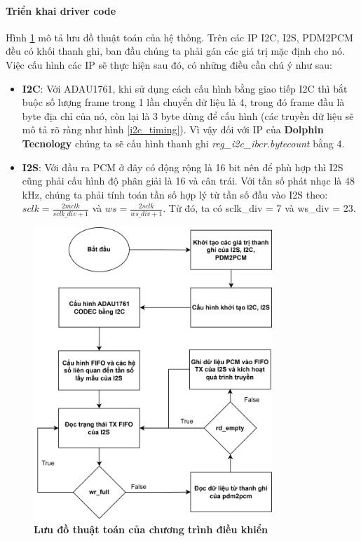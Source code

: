 \paragraph{Triển khai driver code} \label{code}
Hình \ref{flow_chart} mô tả lưu đồ thuật toán của hệ thống. Trên các IP I2C, I2S, PDM2PCM đều có khối thanh ghi, ban đầu chúng ta phải gán các giá trị mặc định cho nó. Việc cấu hình các IP sẽ thực hiện sau đó, có những điều cần chú ý như sau:
\begin{itemize}
    \item \textbf{I2C}: Với ADAU1761, khi sử dụng cách cấu hình bằng giao tiếp I2C thì bắt buộc số lượng frame trong 1 lần chuyển dữ liệu là 4, trong đó frame đầu là byte địa chỉ của nó, còn lại là 3 byte dùng để cấu hình (các truyền dữ liệu sẽ mô tả rõ ràng như hình \ref{i2c_timing}). Vì vậy đối với IP của \textbf{Dolphin Tecnology} chúng ta sẽ cấu hình thanh ghi \textit{reg\_i2c\_ibcr.bytecount} bằng 4.
    \item \textbf{I2S}: Với đầu ra PCM ở đây có động rộng là 16 bit nên để phù hợp thì I2S cũng phải cấu hình độ phân giải là 16 và cân trái. Với tần số phát nhạc là 48 kHz, chúng ta phải tính toán tần số hợp lý từ tần số đầu vào I2S theo: $sclk = \frac{2mclk}{sclk\_div + 1}$ và $ws=\frac{2sclk}{ws\_div + 1}$. Từ đó, ta có sclk\_div = 7 và ws\_div = 23.
\end{itemize}

\begin{figure}[H]
    \centering
    \includegraphics[width=9cm]{Images/Chuong5/fpga/flow_chart.png}
    \caption[Lưu đồ thuật toán của chương trình điều khiển]{\bfseries \fontsize{12pt}{0pt}\selectfont Lưu đồ thuật toán của chương trình điều khiển}
    \label{flow_chart}
\end{figure}

